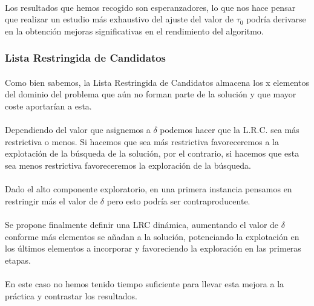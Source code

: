 	\paragraph{}Los resultados que hemos recogido son esperanzadores, lo que nos hace pensar que realizar un estudio más exhaustivo del ajuste del valor de $\tau_{0}$ podría derivarse en la obtención mejoras significativas en el rendimiento del algoritmo. 
	
	\subsubsection{Lista Restringida de Candidatos}
	
	\paragraph{}Como bien sabemos, la Lista Restringida de Candidatos almacena los x elementos del dominio del problema que aún no forman parte de la solución y que mayor coste aportarían a esta.
	
	\paragraph{}Dependiendo del valor que asignemos a $\delta$ podemos hacer que la L.R.C. sea más restrictiva o menos. Si hacemos que sea más restrictiva favoreceremos a la explotación de la búsqueda de la solución, por el contrario, si hacemos que esta sea menos restrictiva favoreceremos la exploración de la búsqueda.
	
	\paragraph{}Dado el alto componente exploratorio, en una primera instancia pensamos en restringir más el valor de $\delta$ pero esto podría ser contraproducente. 
	
	\paragraph{} Se propone finalmente definir una LRC dinámica, aumentando el valor de $\delta$ conforme más elementos se añadan a la solución, potenciando la explotación en los últimos elementos a incorporar y favoreciendo la exploración en las primeras etapas.
	
	\paragraph{}En este caso no hemos tenido tiempo suficiente para llevar esta mejora a la práctica y contrastar los resultados.
	
